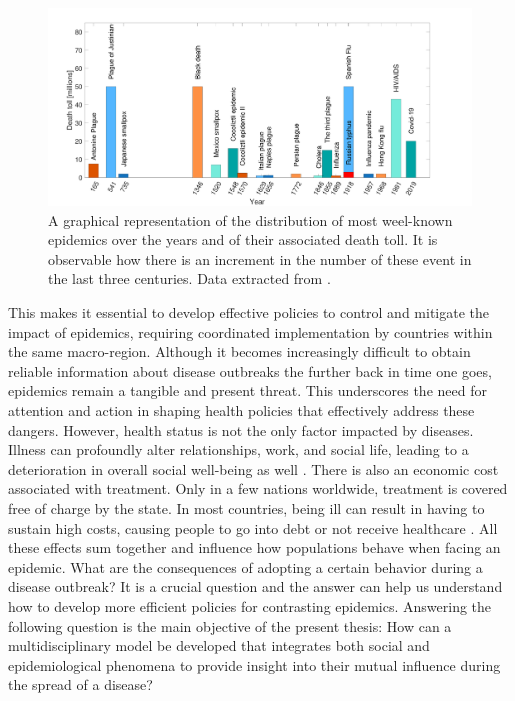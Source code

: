 \begin{figure}[ht]
	\centering
	\includegraphics[width=0.95\linewidth]{0_introduction/images_introduction/worst_epidemic}
	\caption[Epidemic distribution in time]{A graphical representation of the distribution of most weel-known epidemics over the years and of their associated death toll. It is observable how there is an increment in the number of these event in the last three centuries. Data extracted from \cite{owid_historical_pandemics,wiki_pandemics}.}
	\label{fig:worstepidemic}
\end{figure}

 This makes it essential to develop effective policies to control and mitigate the impact of epidemics, requiring coordinated implementation by countries within the same macro-region. Although it becomes increasingly difficult to obtain reliable information about disease outbreaks the further back in time one goes, epidemics remain a tangible and present threat. This underscores the need for attention and action in shaping health policies that effectively address these dangers.
However, health status is not the only factor impacted by diseases. Illness can profoundly alter relationships, work, and social life, leading to a deterioration in overall social well-being as well \cite{Yang_2020}. 
There is also an economic cost associated with treatment. Only in a few nations worldwide, treatment is covered free of charge by the state. In most countries, being ill can result in having to sustain high costs, causing people to go into debt or not receive healthcare \cite{esteban_2017, Barlow2021}. 
All these effects sum together and influence how populations behave when facing an epidemic. What are the consequences of adopting a certain behavior during a disease outbreak? It is a crucial question and the answer can help us understand how to develop more efficient policies for contrasting epidemics. Answering the following question is the main objective of the present thesis: How can a multidisciplinary model be developed that integrates both social and epidemiological phenomena to provide insight into their mutual influence during the spread of a disease?\\

